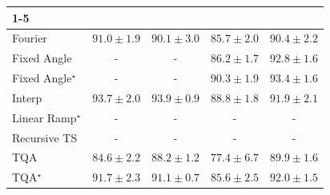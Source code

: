 \begin{tabular}{l|cccc|}
\cline{1-5}
\multicolumn{5}{c}{\rule{0pt}{8pt}PP} \\
\midrule
Fourier & {\cellcolor[HTML]{39A056}} \color[HTML]{F1F1F1} $91.0\pm 1.9$ & {\cellcolor[HTML]{45AD5F}} \color[HTML]{F1F1F1} $90.1\pm 3.0$ & {\cellcolor[HTML]{9DD688}} \color[HTML]{000000} $85.7\pm 2.0$ & {\cellcolor[HTML]{3FA95C}} \color[HTML]{F1F1F1} $90.4\pm 2.2$ \\
Fixed Angle & {\cellcolor[HTML]{000000}} \color[HTML]{F1F1F1} {\cellcolor{white}} \color{black} - & {\cellcolor[HTML]{000000}} \color[HTML]{F1F1F1} {\cellcolor{white}} \color{black} - & {\cellcolor[HTML]{93D284}} \color[HTML]{000000} $86.2\pm 1.7$ & {\cellcolor[HTML]{258745}} \color[HTML]{F1F1F1} $92.8\pm 1.6$ \\
Fixed Angle$^\star$ & {\cellcolor[HTML]{000000}} \color[HTML]{F1F1F1} {\cellcolor{white}} \color{black} - & {\cellcolor[HTML]{000000}} \color[HTML]{F1F1F1} {\cellcolor{white}} \color{black} - & {\cellcolor[HTML]{42AB5D}} \color[HTML]{F1F1F1} $90.3\pm 1.9$ & {\cellcolor[HTML]{1E8041}} \color[HTML]{F1F1F1} $93.4\pm 1.6$ \\
Interp & {\cellcolor[HTML]{197C40}} \color[HTML]{F1F1F1} $93.7\pm 2.0$ & {\cellcolor[HTML]{177B3F}} \color[HTML]{F1F1F1} $93.9\pm 0.9$ & {\cellcolor[HTML]{5FBA6C}} \color[HTML]{F1F1F1} $88.8\pm 1.8$ & {\cellcolor[HTML]{2F944E}} \color[HTML]{F1F1F1} $91.9\pm 2.1$ \\
Linear Ramp$^\star$ & {\cellcolor[HTML]{000000}} \color[HTML]{F1F1F1} {\cellcolor{white}} \color{black} - & {\cellcolor[HTML]{000000}} \color[HTML]{F1F1F1} {\cellcolor{white}} \color{black} - & {\cellcolor[HTML]{000000}} \color[HTML]{F1F1F1} {\cellcolor{white}} \color{black} - & {\cellcolor[HTML]{000000}} \color[HTML]{F1F1F1} {\cellcolor{white}} \color{black} - \\
Recursive TS & {\cellcolor[HTML]{000000}} \color[HTML]{F1F1F1} {\cellcolor{white}} \color{black} - & {\cellcolor[HTML]{000000}} \color[HTML]{F1F1F1} {\cellcolor{white}} \color{black} - & {\cellcolor[HTML]{000000}} \color[HTML]{F1F1F1} {\cellcolor{white}} \color{black} - & {\cellcolor[HTML]{000000}} \color[HTML]{F1F1F1} {\cellcolor{white}} \color{black} - \\
TQA & {\cellcolor[HTML]{B2DF90}} \color[HTML]{000000} $84.6\pm 2.2$ & {\cellcolor[HTML]{6BC072}} \color[HTML]{000000} $88.2\pm 1.2$ & {\cellcolor[HTML]{FDFEDB}} \color[HTML]{000000} $77.4\pm 6.7$ & {\cellcolor[HTML]{49AF61}} \color[HTML]{F1F1F1} $89.9\pm 1.6$ \\
TQA$^\star$ & {\cellcolor[HTML]{31974F}} \color[HTML]{F1F1F1} $91.7\pm 2.3$ & {\cellcolor[HTML]{389F55}} \color[HTML]{F1F1F1} $91.1\pm 0.7$ & {\cellcolor[HTML]{9FD788}} \color[HTML]{000000} $85.6\pm 2.5$ & {\cellcolor[HTML]{2E924C}} \color[HTML]{F1F1F1} $92.0\pm 1.5$ \\

\end{tabular}
